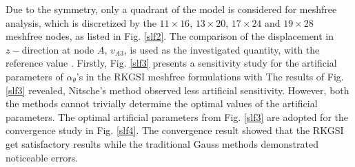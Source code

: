 Due to the symmetry, only a quadrant of the model is considered for meshfree analysis, which is discretized by the $11\times 16$, $13\times 20$, $17\times 24$ and $19\times28$ meshfree nodes, as listed in Fig. \ref{slf2}. The comparison of the displacement in $z-$direction at node $A$, $v_{A3}$, is used as the investigated quantity, with the reference value \DIFdelbegin {}\DIFdelend \DIFaddbegin {}\DIFaddend . Firstly, Fig. \ref{slf3} presents a sensitivity study for the artificial parameters of \DIFdelbegin {}\DIFdelend \DIFaddbegin {}\DIFaddend $\alpha_\theta$'s in the RKGSI meshfree formulations with \DIFdelbegin {}\DIFdelend \DIFaddbegin {}\DIFaddend The results of Fig. \ref{slf3} revealed, \DIFaddbegin {}\DIFaddend Nitsche's method observed less artificial sensitivity. However, both the methods cannot trivially determine the optimal values of the artificial parameters. The optimal artificial parameters from Fig. \ref{slf3} are adopted for the convergence study in Fig. \ref{slf4}. The convergence result showed that the RKGSI \DIFaddbegin {}\DIFaddend get satisfactory results while the traditional Gauss methods demonstrated noticeable errors.

